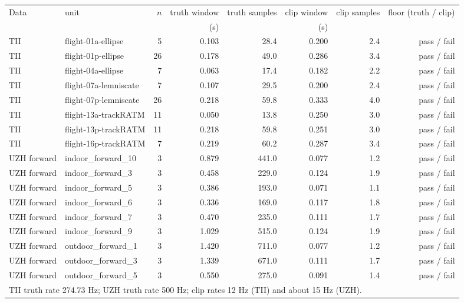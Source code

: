 \scriptsize
\begin{tabular}{llrrrrrr}
\toprule
Data & unit & $n$ & truth window & truth samples & clip window & clip samples & floor (truth / clip) \\
 & & & (s) & & (s) & & \\
\midrule
TII & flight-01a-ellipse & 5 & 0.103 & 28.4 & 0.200 & 2.4 & pass / fail \\
TII & flight-01p-ellipse & 26 & 0.178 & 49.0 & 0.286 & 3.4 & pass / fail \\
TII & flight-04a-ellipse & 7 & 0.063 & 17.4 & 0.182 & 2.2 & pass / fail \\
TII & flight-07a-lemniscate & 7 & 0.107 & 29.5 & 0.200 & 2.4 & pass / fail \\
TII & flight-07p-lemniscate & 26 & 0.218 & 59.8 & 0.333 & 4.0 & pass / fail \\
TII & flight-13a-trackRATM & 11 & 0.050 & 13.8 & 0.250 & 3.0 & pass / fail \\
TII & flight-13p-trackRATM & 11 & 0.218 & 59.8 & 0.251 & 3.0 & pass / fail \\
TII & flight-16p-trackRATM & 7 & 0.219 & 60.2 & 0.287 & 3.4 & pass / fail \\
\midrule
UZH forward & indoor\_forward\_10 & 3 & 0.879 & 441.0 & 0.077 & 1.2 & pass / fail \\
UZH forward & indoor\_forward\_3 & 3 & 0.458 & 229.0 & 0.124 & 1.9 & pass / fail \\
UZH forward & indoor\_forward\_5 & 3 & 0.386 & 193.0 & 0.071 & 1.1 & pass / fail \\
UZH forward & indoor\_forward\_6 & 3 & 0.336 & 169.0 & 0.117 & 1.8 & pass / fail \\
UZH forward & indoor\_forward\_7 & 3 & 0.470 & 235.0 & 0.111 & 1.7 & pass / fail \\
UZH forward & indoor\_forward\_9 & 3 & 1.029 & 515.0 & 0.124 & 1.9 & pass / fail \\
UZH forward & outdoor\_forward\_1 & 3 & 1.420 & 711.0 & 0.077 & 1.2 & pass / fail \\
UZH forward & outdoor\_forward\_3 & 3 & 1.339 & 671.0 & 0.111 & 1.7 & pass / fail \\
UZH forward & outdoor\_forward\_5 & 3 & 0.550 & 275.0 & 0.091 & 1.4 & pass / fail \\
\bottomrule
\multicolumn{8}{l}{\footnotesize TII truth rate 274.73 Hz; UZH truth rate 500 Hz; clip rates 12 Hz (TII) and about 15 Hz (UZH).} \\
\end{tabular}
